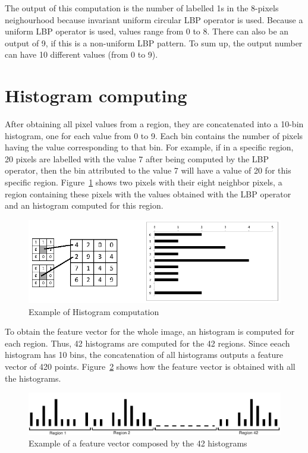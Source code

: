 \noindent The output of this computation is the number of labelled 1s in the 8-pixels neighourhood because invariant uniform circular LBP operator is used. Because a uniform LBP operator is used, values range from 0 to 8. There can also be an output of 9, if this is a non-uniform LBP pattern. To sum up, the output number can have 10 different values (from 0 to 9).
\newline

\section{Histogram computing}

\vspace{\baselineskip}
After obtaining all pixel values from a region, they are concatenated into a 10-bin histogram, one for each value from 0 to 9. Each bin contains the number of pixels having the value corresponding to that bin. For example, if in a specific region, 20 pixels are labelled with the value 7 after being computed by the LBP operator, then the bin attributed to the value 7 will have a value of 20 for this specific region. Figure~\ref{lbp_implementation_histogram} shows two pixels with their eight neighbor pixels, a region containing these pixels with the values obtained with the LBP operator and an histogram computed for this region.
\newline

\begin{figure}[!h]
\begin{center}
\noindent \includegraphics[scale=0.6]{figures/lbp_implementation_histogram} 
\newline
\caption{Example of Histogram computation}
\label{lbp_implementation_histogram}
\end{center} 
\end{figure}

\noindent To obtain the feature vector for the whole image, an histogram is computed for each region. Thus, 42 histograms are computed for the 42 regions. Since eeach histogram has 10 bins, the concatenation of all histograms outputs a feature vector of 420 points. Figure~\ref{lbp_implementation_vector} shows how the feature vector is obtained with all the histograms.
\newline

\begin{figure}[!h]
\begin{center}
\noindent \includegraphics[scale=0.4]{figures/lbp_implementation_vector} 
\newline
\caption{Example of a feature vector composed by the 42 histograms}
\label{lbp_implementation_vector}
\end{center} 
\end{figure}

